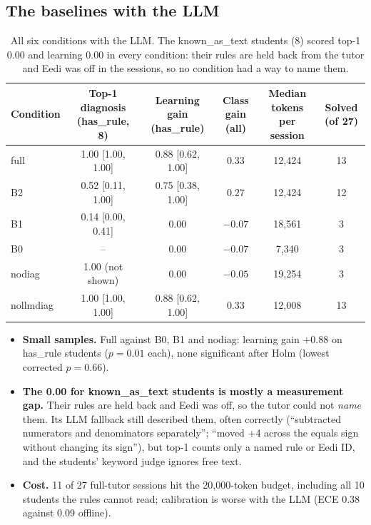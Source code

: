 \documentclass[11pt,a4paper]{article}
\newcommand{\grp}[1]{\textsf{#1}}
\newcommand{\cond}[1]{\textsf{#1}}
\begin{document}
\subsection{The baselines with the LLM}\label{sec:baselines}

\begin{table}[!htbp]
\centering\small
\begin{tabularx}{\linewidth}{@{}lCCCCC@{}}
\toprule
Condition & Top-1 diagnosis (\grp{has\_rule}, 8) & Learning gain (\grp{has\_rule}) & Class gain (all) & Median tokens per session & Solved (of 27) \\
\midrule
{}full & 1.00 [1.00, 1.00] & 0.88 [0.62, 1.00] & 0.33 & 12,424 & 13 \\
B2 & 0.52 [0.11, 1.00] & 0.75 [0.38, 1.00] & 0.27 & 12,424 & 12 \\
B1 & 0.14 [0.00, 0.41] & 0.00 & $-0.07$ & 18,561 & 3 \\
B0 & -- & 0.00 & $-0.07$ & 7,340 & 3 \\
nodiag & 1.00 (not shown) & 0.00 & $-0.05$ & 19,254 & 3 \\
nollmdiag & 1.00 [1.00, 1.00] & 0.88 [0.62, 1.00] & 0.33 & 12,008 & 13 \\
\bottomrule
\end{tabularx}
\caption{All six conditions with the LLM. The \grp{known\_as\_text} students (8) scored top-1 0.00 and learning 0.00 in every condition: their rules are held back from the tutor and Eedi was off in the sessions, so no condition had a way to name them.}
\end{table}

\begin{itemize}
  \item \textbf{Small samples.} Full against B0, B1 and \cond{nodiag}: learning gain $+0.88$ on \grp{has\_rule} students ($p = 0.01$ each), none significant after Holm (lowest corrected $p = 0.66$).
  \item \textbf{The 0.00 for \grp{known\_as\_text} students is mostly a measurement gap.} Their rules are held back and Eedi was off, so the tutor could not \emph{name} them. Its LLM fallback still described them, often correctly (``subtracted numerators and denominators separately''; ``moved +4 across the equals sign without changing its sign''), but top-1 counts only a named rule or Eedi ID, and the students' keyword judge ignores free text.
  \item \textbf{Cost.} 11 of 27 full-tutor sessions hit the 20,000-token budget, including all 10 students the rules cannot read; calibration is worse with the LLM (ECE 0.38 against 0.09 offline).
\end{itemize}
\end{document}
